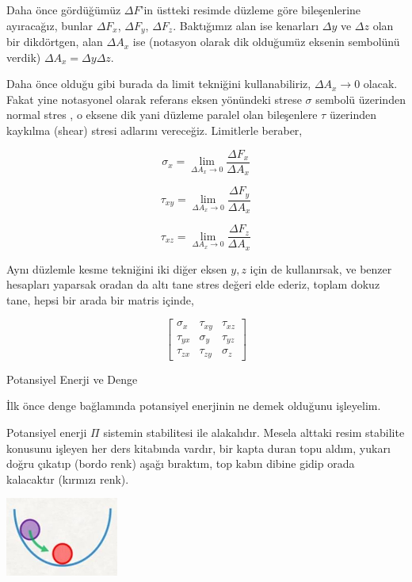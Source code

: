 \documentclass[12pt,fleqn]{article}\usepackage{../../common}
\begin{document}
Daha önce gördüğümüz $\Delta F$'in üstteki resimde düzleme göre bileşenlerine
ayıracağız, bunlar $\Delta F_x$, $\Delta F_y$, $\Delta F_z$. Baktığımız alan ise
kenarları $\Delta y$ ve $\Delta z$ olan bir dikdörtgen, alan $\Delta A_x$ ise
(notasyon olarak dik olduğumüz eksenin sembolünü verdik)
$\Delta A_x = \Delta y \Delta z$.

Daha önce olduğu gibi burada da limit tekniğini kullanabiliriz, $\Delta A_x \to
0$ olacak. Fakat yine notasyonel olarak referans eksen yönündeki strese $\sigma$
sembolü üzerinden normal stres , o eksene dik yani düzleme paralel olan
bileşenlere $\tau$ üzerinden kaykılma (shear) stresi adlarını vereceğiz.
Limitlerle beraber,

$$
\sigma_x = \lim_{\Delta A_x \to 0 } \frac{\Delta F_x}{\Delta A_x}
$$

$$
\tau_{xy} = \lim_{\Delta A_x \to 0 } \frac{\Delta F_y}{\Delta A_x}
$$

$$
\tau_{xz} = \lim_{\Delta A_x \to 0 } \frac{\Delta F_z}{\Delta A_x}
$$

Aynı düzlemle kesme tekniğini iki diğer eksen $y,z$ için de kullanırsak, ve
benzer hesapları yaparsak oradan da altı tane stres değeri elde ederiz, toplam
dokuz tane, hepsi bir arada bir matris içinde,

$$
\left[\begin{array}{rrr}
\sigma_x & \tau_{xy} & \tau_{xz} \\
\tau_{yx} & \sigma_y & \tau_{yz} \\
\tau_{zx} & \tau_{zy} & \sigma_z
\end{array}\right]
$$





















Potansiyel Enerji ve Denge

İlk önce denge bağlamında potansiyel enerjinin ne demek olduğunu işleyelim.

Potansiyel enerji $\Pi$ sistemin stabilitesi ile alakalıdır. Mesela alttaki
resim stabilite konusunu işleyen her ders kitabında vardır, bir kapta duran topu
aldım, yukarı doğru çıkatıp (bordo renk) aşağı bıraktım, top kabın dibine gidip
orada kalacaktır (kırmızı renk). 

\includegraphics[width=10em]{phy_020_strs_04_01.jpg}
\end{document}
